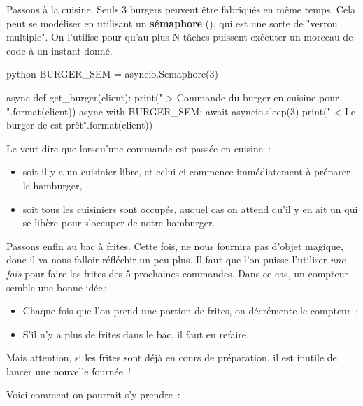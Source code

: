 \documentclass[small]{zmdocument}
\begin{document}
Passons à la cuisine. Seuls 3 burgers peuvent être fabriqués en même temps. Cela
peut se modéliser en utilisant un \textbf{sémaphore} (), qui est
une sorte de "verrou multiple". On l’utilise pour qu’au plus N tâches
puissent exécuter un morceau de code à un instant donné.



\begin{CodeBlock}{python}
BURGER_SEM = asyncio.Semaphore(3)

async def get_burger(client):
    print("    > Commande du burger en cuisine pour {}".format(client))
    async with BURGER_SEM:
        await asyncio.sleep(3)
        print("    < Le burger de {} est prêt".format(client))
\end{CodeBlock}



Le  veut dire que lorsqu’une commande est passée
en cuisine :



\begin{itemize}
\item\relax soit il y a un cuisinier libre, et celui-ci commence immédiatement à
préparer le hamburger,
\item\relax soit tous les cuisiniers sont occupés, auquel cas on attend qu’il y en ait un
qui se libère pour s’occuper de notre hamburger.
\end{itemize}


Passons enfin au bac à frites. Cette fois,  ne nous fournira pas
d’objet magique, donc il va nous falloir réfléchir un peu plus. Il faut que
l’on puisse l’utiliser \textit{une fois} pour faire les frites des 5 prochaines
commandes. Dans ce cas, un compteur semble une bonne idée :



\begin{itemize}
\item\relax Chaque fois que l’on prend une portion de frites, on décrémente le compteur ;
\item\relax S’il n’y a plus de frites dans le bac, il faut en refaire.
\end{itemize}


Mais attention, si les frites sont déjà en cours de préparation, il est inutile de
lancer une nouvelle fournée !



Voici comment on pourrait s’y prendre :
\end{document}
